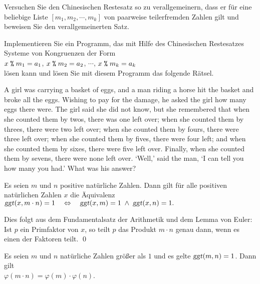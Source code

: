 \exercise
Versuchen Sie den Chinesischen Restesatz so zu verallgemeinern, dass er für eine beliebige
Liste $[m_1, m_2, \cdots, m_k]$ von paarweise teilerfremden Zahlen gilt und beweisen
Sie den verallgemeinerten Satz.

\exercise
Implementieren Sie ein Programm, das mit Hilfe des Chinesischen Restesatzes Systeme von
Kongruenzen der Form
\\[0.2cm]
\hspace*{1.3cm}
$x \;\texttt{\%}\; m_1 = a_1$, 
$x \;\texttt{\%}\; m_2 = a_2$, $\cdots$,
$x \;\texttt{\%}\; m_k = a_k$
\\[0.2cm]
lösen kann und lösen Sie mit diesem Programm das folgende Rätsel.
\vspace*{0.2cm}

\begin{minipage}[t]{0.9\linewidth}
  A girl was carrying a basket of eggs, and a man riding a horse hit
  the basket and broke all the eggs. Wishing to pay for the damage, he
  asked the girl how many eggs there were. The girl said she did not
  know, but she remembered that when she counted them by twos, there
  was one left over; when she counted them by threes, there were two
  left over; when she counted them by fours, there were three left
  over; when she counted them by fives, there were four left; and when
  she counted them by sixes, there were five left over. Finally, when
  she counted them by sevens, there were none left over. `Well,' said
  the man, `I can tell you how many you had.' What was his answer?
\end{minipage}

\begin{Satz} \label{satz:china3}
  Es seien $m$ und $n$ positive natürliche Zahlen.
  Dann gilt für alle positiven natürlichen Zahlen $x$ die Äquivalenz
  \\[0.2cm]
  \hspace*{1.3cm}
  $\textsl{ggt}(x, m \cdot n) = 1 \quad \Leftrightarrow \quad
   \textsl{ggt}(x, m) = 1 \;\wedge\; \textsl{ggt}(x, n) = 1.
  $
\end{Satz}

\proof
Dies folgt aus dem Fundamentalsatz der Arithmetik und dem Lemma von Euler: Ist $p$ ein
Primfaktor von $x$, so teilt $p$ das Produkt $m \cdot n$ genau dann, wenn es einen der
Faktoren teilt. \qed



\begin{Satz} \lb
  Es seien $m$ und $n$ natürliche Zahlen größer als $1$ und es gelte $\textsl{ggt}(m,n) = 1$.
  Dann gilt
  \\[0.2cm]
  \hspace*{1.3cm}
  $\varphi(m \cdot n) = \varphi(m) \cdot \varphi(n)$.
\end{Satz}

